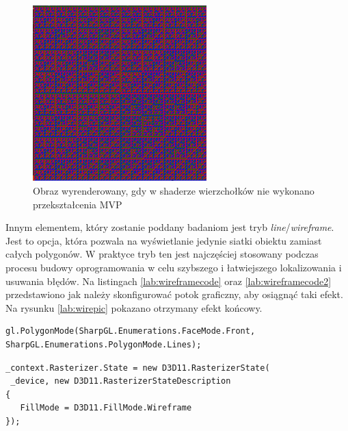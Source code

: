 \documentclass[archive]{mgr}
\begin{document}
\begin{figure}[h!]
  \centering
    \includegraphics[width=0.60\textwidth]{images/noshad.png}
   \caption{Obraz wyrenderowany, gdy w shaderze wierzchołków nie wykonano przekształcenia MVP}
   \label{lab:noshad}
\end{figure}


Innym elementem, który zostanie poddany badaniom jest tryb \emph{line}/\emph{wireframe}. Jest to opcja, która pozwala na wyświetlanie jedynie siatki obiektu zamiast całych polygonów.  W praktyce tryb ten jest najczęściej stosowany podczas procesu budowy oprogramowania w celu szybszego i łatwiejszego lokalizowania i usuwania błędów. Na listingach \ref{lab:wireframecode} oraz \ref{lab:wireframecode2} przedstawiono jak należy skonfigurować potok graficzny, aby osiągnąć taki efekt. Na rysunku \ref{lab:wirepic} pokazano otrzymany efekt końcowy.\\

\begin{lstlisting}[caption={OpenGL – ustawienie trybu rysowania linii},captionpos=b,label={lab:wireframecode}]
gl.PolygonMode(SharpGL.Enumerations.FaceMode.Front,
SharpGL.Enumerations.PolygonMode.Lines);
\end{lstlisting}

\begin{lstlisting}[caption={DirectX – ustawienie trybu rysowania linii},captionpos=b,label={lab:wireframecode2}]
 _context.Rasterizer.State = new D3D11.RasterizerState(
 _device, new D3D11.RasterizerStateDescription
{
   FillMode = D3D11.FillMode.Wireframe
});

\end{lstlisting}
\end{document}
